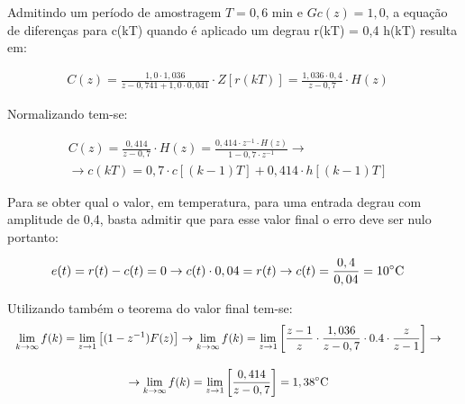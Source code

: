 \documentclass[a4paper,12pt]{article}
\begin{document}
			Admitindo um período de amostragem $T = 0,6$ min e $Gc(z) = 1,0$, a equação de diferenças para c(kT) quando é aplicado um degrau r(kT) = 0,4 h(kT) resulta em:
			
			\begin{equation}
				\left.
				\begin{array}{c}
					\displaystyle C(z) = \frac{1,0 \cdot 1,036}{z - 0,741 + 1,0 \cdot 0,041} \cdot Z\left[r(kT)\right] = \frac{1,036\cdot 0,4}{z - 0,7} \cdot H(z)
				\end{array}
				\right.
				\quad 
			\end{equation}
			
			Normalizando tem-se:
			
			\begin{equation}
				\left.
				\begin{array}{c}
					\displaystyle C(z) = \frac{0,414}{z - 0,7} \cdot H(z) = \frac{0,414 \cdot z^{-1} \cdot H(z)}{1 - 0,7 \cdot z^{-1}}  \rightarrow \\[20pt]
					\rightarrow \displaystyle c(kT) = 0,7\cdot c[(k-1)T] + 0,414 \cdot h[(k-1)T]
				\end{array}
				\right.
				\quad 
			\end{equation}
			
			Para se obter qual o valor, em temperatura, para uma entrada degrau com amplitude de 0,4, basta admitir que para esse valor final o erro deve ser nulo portanto:
			
			\begin{equation}
				\left.
				\begin{array}{c}
					\displaystyle e(t)= r(t) - c(t) = 0 \rightarrow c(t) \cdot 0,04 = r(t) \rightarrow c(t) = \frac{0,4}{0,04} = 10 \celsius
				\end{array}
				\right.
				\quad 
			\end{equation}
			
			Utilizando também o teorema do valor final tem-se:
			\begin{equation}
				\left.
				\begin{array}{c}
					\displaystyle \lim_{k \to \infty}f(k) = \lim_{z \to 1}\left[(1-z^{-1})F(z) \right] \rightarrow \lim_{k \to \infty}f(k) = \lim_{z \to 1}\left[ \frac{z-1}{z} \cdot \frac{1,036}{z - 0,7} \cdot 0.4 \cdot \frac{z}{z-1}  \right] \rightarrow \\[20pt]
					
					\displaystyle \rightarrow \lim_{k \to \infty}f(k) =  \lim_{z \to 1}\left[  \frac{0,414}{z - 0,7}  \right] = 1,38 \celsius
				\end{array}
				\right.
				\quad 
			\end{equation}
			
\end{document}
